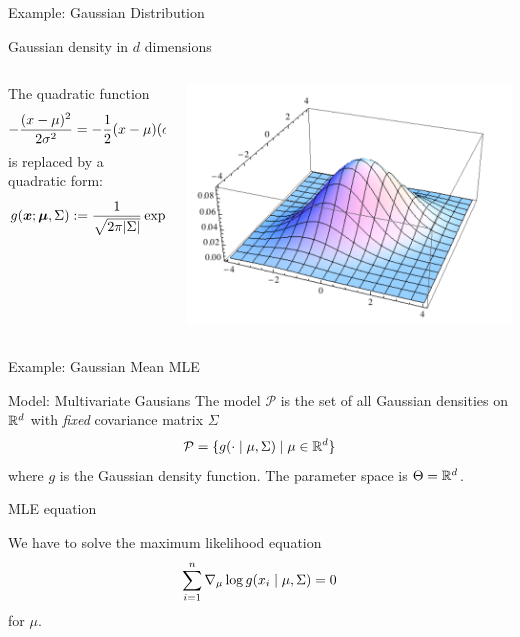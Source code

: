 \documentclass[10pt]{beamer}
\begin{document}
\begin{frame}{Example: Gaussian Distribution}
\begin{sblock}{Gaussian density in $d$ dimensions}
\begin{columns}
\begin{column}{.55\textwidth}
\footnotesize
\vfill \vfill \vfill
The quadratic function 
\[ - \displaystyle\frac{(x-\mu)^2}{2 \sigma^2} = -\displaystyle\frac{1}{2} (x-\mu) (\sigma^1)^{-1} (x - \mu) \]
is replaced by a quadratic form:
\[ g({\boldsymbol x}; {\boldsymbol \mu}, \Sigma) := \displaystyle\frac{1}{\sqrt{2 \pi |\Sigma|}} \exp \bigg( { - \displaystyle\frac{1}{2} ({\boldsymbol x} - {\boldsymbol \mu})^T \Sigma^{-1} ( {\boldsymbol x} - {\boldsymbol \mu})} \bigg) \]
\end{column}
\begin{column}{.3\textwidth}
\includegraphics[width=\textwidth]{images/gaussian_nd}
\end{column}
\end{columns}
\end{sblock}

\end{frame}



\begin{frame}{Example: Gaussian Mean MLE}

\begin{sblock}{Model: Multivariate Gausians}
The model $\mathcal{P}$ is the set of all Gaussian densities on $\mathbb{R}^d$ with \textit{fixed} covariance matrix $\Sigma$
\[ \mathcal{P} = \{ {g(\cdot \; | \; \mu, \Sigma) \; | \; \mu \in \mathbb{R}^d} \} \]
where $g$ is the Gaussian density function.  The parameter space is $\Theta = \mathbb{R}^d$.
\end{sblock}

\begin{sblock}{MLE equation}

We have to solve the maximum likelihood equation 
\[ \displaystyle\sum_{i=1}^n \nabla_\mu \log g(x_i \; | \; \mu, \Sigma) = 0 \]
for $\mu$.
\end{sblock}

\end{frame}
\end{document}
